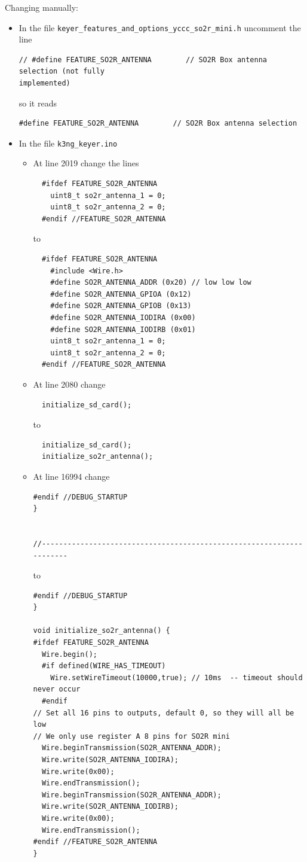 \documentclass[12pt]{article}
\begin{document}
Changing manually:
\begin{itemize}
\item
In the file \verb|keyer_features_and_options_yccc_so2r_mini.h| uncomment
the line
\begin{verbatim}
// #define FEATURE_SO2R_ANTENNA        // SO2R Box antenna selection (not fully
implemented)
\end{verbatim}
so it reads
\begin{verbatim}
#define FEATURE_SO2R_ANTENNA        // SO2R Box antenna selection
\end{verbatim}
\item
In the file \verb|k3ng_keyer.ino|
\begin{itemize}
\item
At line 2019 change the lines
\begin{verbatim}
  #ifdef FEATURE_SO2R_ANTENNA
    uint8_t so2r_antenna_1 = 0;
    uint8_t so2r_antenna_2 = 0;
  #endif //FEATURE_SO2R_ANTENNA
\end{verbatim}
to
\begin{verbatim}
  #ifdef FEATURE_SO2R_ANTENNA
    #include <Wire.h>
    #define SO2R_ANTENNA_ADDR (0x20) // low low low
    #define SO2R_ANTENNA_GPIOA (0x12)
    #define SO2R_ANTENNA_GPIOB (0x13)
    #define SO2R_ANTENNA_IODIRA (0x00)
    #define SO2R_ANTENNA_IODIRB (0x01)
    uint8_t so2r_antenna_1 = 0;
    uint8_t so2r_antenna_2 = 0;
  #endif //FEATURE_SO2R_ANTENNA
\end{verbatim}
\item
At line 2080 change
\begin{verbatim}
  initialize_sd_card();
\end{verbatim}
to
\begin{verbatim}
  initialize_sd_card();
  initialize_so2r_antenna();
\end{verbatim}
\item
At line 16994 change
\begin{verbatim}
#endif //DEBUG_STARTUP
}


//---------------------------------------------------------------------
\end{verbatim}
to
\begin{verbatim}
#endif //DEBUG_STARTUP
}

void initialize_so2r_antenna() {
#ifdef FEATURE_SO2R_ANTENNA
  Wire.begin();
  #if defined(WIRE_HAS_TIMEOUT)
    Wire.setWireTimeout(10000,true); // 10ms  -- timeout should never occur
  #endif
// Set all 16 pins to outputs, default 0, so they will all be low
// We only use register A 8 pins for SO2R mini
  Wire.beginTransmission(SO2R_ANTENNA_ADDR);
  Wire.write(SO2R_ANTENNA_IODIRA);
  Wire.write(0x00);
  Wire.endTransmission();
  Wire.beginTransmission(SO2R_ANTENNA_ADDR);
  Wire.write(SO2R_ANTENNA_IODIRB);
  Wire.write(0x00);
  Wire.endTransmission();
#endif //FEATURE_SO2R_ANTENNA
}


\end{verbatim}
\end{itemize}
\end{itemize}
\end{document}

